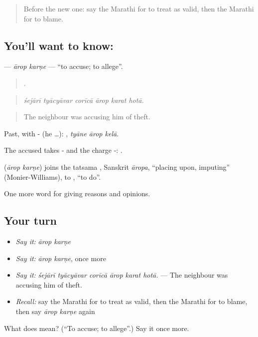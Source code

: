 \begin{quote}
Before the new one: say the Marathi for to treat as valid, then the Marathi for to blame.
\end{quote}

\subsection*{You'll want to know:  }
\textbf{ } — \emph{ārop karṇe} — \textquotedblleft{}to accuse; to allege\textquotedblright{}.

\begin{quote}
     .
\end{quote}

\begin{quote}
\emph{śejārī tyācyāvar corīcā ārop karat hotā.}
\end{quote}

\begin{quote}
The neighbour was accusing him of theft.
\end{quote}

Past, with - (he …):   , \emph{tyāne ārop kelā}.

The accused takes - and the charge -:   .

\begin{cousinweb}
\textbf{ } (\emph{ārop karṇe}) joins the tatsama , Sanskrit \emph{āropa}, \textquotedblleft{}placing upon, imputing\textquotedblright{} (Monier-Williams), to , \textquotedblleft{}to do\textquotedblright{}.
\end{cousinweb}

\begin{grammarlens}[title={What you've built}]
One more word for giving reasons and opinions.
\end{grammarlens}

\subsection*{Your turn}
\begin{itemize}
\raggedright
  \item \emph{Say it:} \emph{ārop karṇe}
  \item \emph{Say it:} \emph{ārop karṇe}, once more
  \item \emph{Say it:} \emph{śejārī tyācyāvar corīcā ārop karat hotā.} — The neighbour was accusing him of theft.
  \item \emph{Recall:} say the Marathi for to treat as valid, then the Marathi for to blame, then say \emph{ārop karṇe} again
\end{itemize}

\begin{tcolorbox}[breakable,colback=teal!4,colframe=teal!35!black,title={Before you move on}]
What does   mean? (\textquotedblleft{}To accuse; to allege\textquotedblright{}.) Say it once more.
\end{tcolorbox}

